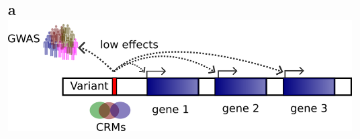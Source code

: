 %
%
%
%

%
\begin{figure}[!ht]
    \centering

    \begin{subfigure}[]{0.99\textwidth}
        \textbf{a}
        \\
        \includegraphics[width=\textwidth]{fig/model1.png}
    \end{subfigure}

\end{figure}

